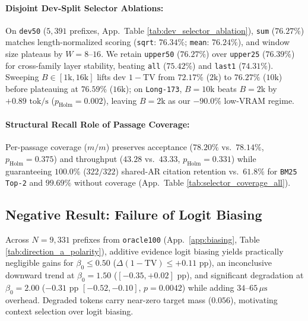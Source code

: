 \documentclass[11pt]{article}
\begin{document}
\paragraph{Disjoint Dev-Split Selector Ablations:}
On \texttt{dev50} ($5,391$ prefixes, App.\ Table \ref{tab:dev_selector_ablation}), \texttt{sum} ($76.27\%$) matches length-normalized scoring (\texttt{sqrt}: $76.34\%$; \texttt{mean}: $76.24\%$), and window size plateaus by $W=8$--$16$. We retain \texttt{upper50} ($76.27\%$) over \texttt{upper25} ($76.39\%$) for cross-family layer stability, beating \texttt{all} ($75.42\%$) and \texttt{last1} ($74.31\%$). Sweeping $B \in [1\text{k}, 16\text{k}]$ lifts dev $1-\text{TV}$ from $72.17\%$ ($2\text{k}$) to $76.27\%$ ($10\text{k}$) before plateauing at $76.59\%$ ($16\text{k}$); on \texttt{Long-173}, $B=10\text{k}$ beats $B=2\text{k}$ by $+0.89\text{ tok/s}$ ($p_{\text{Holm}}=0.002$), leaving $B=2\text{k}$ as our $-90.0\%$ low-VRAM regime.

\paragraph{Structural Recall Role of Passage Coverage:}
Per-passage coverage ($m/m$) preserves acceptance ($78.20\%$ vs.\ $78.14\%$, $p_{\text{Holm}}=0.375$) and throughput ($43.28$ vs.\ $43.33$, $p_{\text{Holm}}=0.331$) while guaranteeing $100.0\%$ ($322/322$) shared-AR citation retention vs.\ $61.8\%$ for \texttt{BM25 Top-2} and $99.69\%$ without coverage (App.\ Table \ref{tab:selector_coverage_all}).

\subsection{Negative Result: Failure of Logit Biasing}
\label{sec:negative_result}
Across $N=9,331$ prefixes from \texttt{oracle100} (App.\ \ref{app:biasing}, Table \ref{tab:direction_a_polarity}), additive evidence logit biasing yields practically negligible gains for $\beta_0 \le 0.50$ ($\Delta(1-\text{TV}) \le +0.11\text{ pp}$), an inconclusive downward trend at $\beta_0=1.50$ ($[-0.35, +0.02]\text{ pp}$), and significant degradation at $\beta_0=2.00$ ($-0.31\text{ pp}$ $[-0.52, -0.10]$, $p=0.0042$) while adding $34$--$65\,\mu\text{s}$ overhead. Degraded tokens carry near-zero target mass ($0.056$), motivating context selection over logit biasing.
\end{document}
